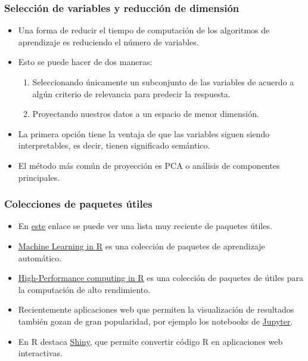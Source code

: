 \documentclass{beamer}
\begin{document}
\begin{frame}
\frametitle{Selección de variables y reducción de dimensión}

\begin{itemize}
\item Una forma de reducir el tiempo de computación de los algoritmos de aprendizaje es reduciendo el número de variables.
\item Esto se puede hacer de dos maneras:
\begin{enumerate}
\item Seleccionando únicamente un subconjunto de las variables de acuerdo a algún criterio de relevancia para predecir la respuesta.
\item Proyectando nuestros datos a un espacio de menor dimensión.
\end{enumerate}
\item La primera opción tiene la ventaja de que las variables siguen siendo interpretables, es decir, tienen significado semántico.
\item El método más común de proyección es PCA o análisis de componentes principales.
\end{itemize}
\end{frame}


\begin{frame}
\frametitle{Colecciones de paquetes útiles}
\begin{itemize}
\item En \href{https://support.rstudio.com/hc/en-us/articles/201057987-Quick-list-of-useful-R-packages}{este} enlace se puede ver una lista muy reciente de paquetes útiles.
\item \href{https://cran.r-project.org/web/views/MachineLearning.html}{Machine Learning in R} es una colección de paquetes de aprendizaje automático.
\item \href{http://cran.r-project.org/web/views/HighPerformanceComputing.html}{High-Performance computing in R} es una colección de paquetes de útiles para la computación de alto rendimiento.
\item Recientemente aplicaciones web que permiten la visualización de resultados también gozan de gran popularidad, por ejemplo los notebooks de \href{http://jupyter.org/}{Jupyter}.
\item En R destaca \href{http://shiny.rstudio.com/}{Shiny}, que permite convertir código R en aplicaciones web interactivas.
\end{itemize}
\end{frame}
\end{document}
